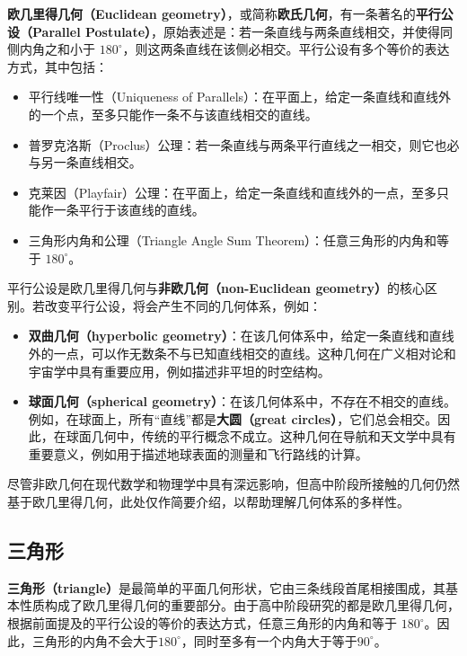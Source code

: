 \textbf{欧几里得几何（Euclidean geometry）}，或简称\textbf{欧氏几何}，有一条著名的\textbf{平行公设（Parallel Postulate）}，原始表述是：若一条直线与两条直线相交，并使得同侧内角之和小于 $180^\circ$，则这两条直线在该侧必相交。平行公设有多个等价的表达方式，其中包括：
\begin{itemize}
\item 平行线唯一性（Uniqueness of Parallels）：在平面上，给定一条直线和直线外的一个点，至多只能作一条不与该直线相交的直线。
\item 普罗克洛斯（Proclus）公理：若一条直线与两条平行直线之一相交，则它也必与另一条直线相交。
\item 克莱因（Playfair）公理：在平面上，给定一条直线和直线外的一点，至多只能作一条平行于该直线的直线。
\item 三角形内角和公理（Triangle Angle Sum Theorem）：任意三角形的内角和等于 $180^\circ$。
\end{itemize}

平行公设是欧几里得几何与\textbf{非欧几何（non-Euclidean geometry）}的核心区别。若改变平行公设，将会产生不同的几何体系，例如：

\begin{itemize}
\item \textbf{双曲几何（hyperbolic geometry）}：在该几何体系中，给定一条直线和直线外的一点，可以作无数条不与已知直线相交的直线。这种几何在广义相对论和宇宙学中具有重要应用，例如描述非平坦的时空结构。
\item \textbf{球面几何（spherical geometry）}：在该几何体系中，不存在不相交的直线。例如，在球面上，所有“直线”都是\textbf{大圆（great circles）}，它们总会相交。因此，在球面几何中，传统的平行概念不成立。这种几何在导航和天文学中具有重要意义，例如用于描述地球表面的测量和飞行路线的计算。
\end{itemize}

尽管非欧几何在现代数学和物理学中具有深远影响，但高中阶段所接触的几何仍然基于欧几里得几何，此处仅作简要介绍，以帮助理解几何体系的多样性。

\subsection{三角形}

\textbf{三角形（triangle）}是最简单的平面几何形状，它由三条线段首尾相接围成，其基本性质构成了欧几里得几何的重要部分。由于高中阶段研究的都是欧几里得几何，根据前面提及的平行公设的等价的表达方式，任意三角形的内角和等于 $180^\circ$。因此，三角形的内角不会大于$180^\circ$，同时至多有一个内角大于等于$90^\circ$。


